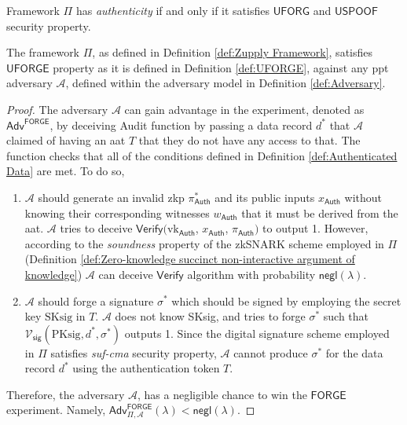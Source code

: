 \begin{definition}[Authenticity]
    \label{def:Authenticity}
     Framework $\Pi$ has \textit{authenticity}  if and only if it satisfies $\mathsf{UFORG}$ and $\mathsf{USPOOF}$ security property.
    \end{definition}


\begin{theorem}

 The framework $\Pi$, as defined in Definition \ref{def:Zupply Framework}, satisfies \textit{$\mathsf{UFORGE}$} property as it is defined in Definition \ref{def:UFORGE}, against any \gls{ppt} adversary $\mathcal{A}$, defined within the adversary model in Definition \ref{def:Adversary}.
 
\end{theorem}


\begin{proof}
    The adversary $\mathcal{A}$ can gain advantage in the  experiment, denoted as $\mathsf{Adv}^{\mathsf{FORGE}}$, by deceiving \textsf{Audit} function by passing a data record $d^\ast$ that $\mathcal{A}$ claimed of having an \gls{aat} $T$ that they do not have any access to that. The function checks that all of the conditions defined in Definition \ref{def:Authenticated Data} are met. To do so, 
    \begin{enumerate}
        \item $\mathcal{A}$ should generate an invalid \gls{zkp} $\pi^\ast_\mathsf{Auth}$ and its public inputs $x_\mathsf{Auth}$ without knowing their corresponding witnesses $w_\mathsf{Auth}$ that it must be derived from the \gls{aat}. $\mathcal{A}$ tries to deceive $\mathsf{Verify}(\text{vk}_\mathsf{Auth}$, $x_\mathsf{Auth}$, $\pi_\mathsf{Auth})$ to output 1. However, according to the \textit{soundness} property of the zkSNARK scheme employed in $\Pi$  (Definition \ref{def:Zero-knowledge succinct non-interactive argument of knowledge}) $\mathcal{A}$ can deceive $\mathsf{Verify}$  algorithm with probability $\mathsf{negl}(\lambda)$.

        \item $\mathcal{A}$ should forge a signature $\sigma^\ast$ which should be signed by employing the secret key $\text{SKsig}$ in $T$. $\mathcal{A}$ does not know  SKsig, and tries to forge $\sigma^\ast$ such that  $\mathcal{V}_\mathsf{sig}(\text{PKsig}, d^\ast, \sigma^\ast)$ outputs 1. Since the digital signature scheme employed in $\Pi$ satisfies \textit{\gls{suf-cma}} security property, $\mathcal{A}$ cannot produce $\sigma^\ast$ for the data record $d^\ast$ using the authentication token $T$.
    \end{enumerate}

    Therefore, the adversary $\mathcal{A}$, has a negligible chance to win the $\mathsf{FORGE}$ experiment. Namely, $\mathsf{Adv}^{\mathsf{FORGE}}_{\Pi, \mathcal{A}}(\lambda) < \mathsf{negl}(\lambda)$. 
\end{proof}





